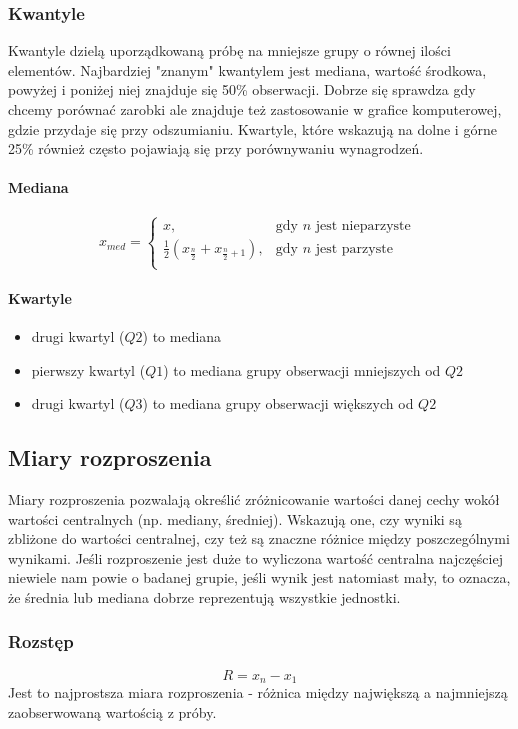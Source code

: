 \documentclass{article}
\theoremstyle{break}
\begin{document}
\subsubsection{Kwantyle}
Kwantyle dzielą uporządkowaną próbę na mniejsze grupy o równej ilości elementów. Najbardziej "znanym" kwantylem jest mediana, wartość środkowa, powyżej i poniżej niej znajduje się 50\% obserwacji. Dobrze się sprawdza gdy chcemy porównać zarobki ale znajduje też zastosowanie w grafice komputerowej, gdzie przydaje się przy odszumianiu. Kwartyle, które wskazują na dolne i górne 25\% również często pojawiają się przy porównywaniu wynagrodzeń.
\paragraph{Mediana}
$$x_{med}=
\begin{cases}
	x, &  \text{gdy $n$ jest nieparzyste }\\
	\frac{1}{2}(x_{\frac{n}{2}}+x_{\frac{n}{2}+1}), &  \text{gdy $n$ jest parzyste}\\
\end{cases}$$
\paragraph{Kwartyle}
\begin{itemize}
	\item drugi kwartyl ($Q2$) to mediana
	\item pierwszy kwartyl ($Q1$) to mediana grupy obserwacji mniejszych od $Q2$
	\item drugi kwartyl ($Q3$) to mediana grupy obserwacji większych od $Q2$
\end{itemize}

\subsection{Miary rozproszenia}

Miary rozproszenia pozwalają określić zróżnicowanie wartości danej cechy wokół wartości centralnych (np. mediany, średniej).  Wskazują one, czy wyniki są zbliżone do wartości centralnej, czy też są znaczne różnice między poszczególnymi wynikami. Jeśli rozproszenie jest duże to wyliczona wartość centralna najczęściej niewiele nam powie o badanej grupie, jeśli wynik jest natomiast mały, to oznacza, że średnia lub mediana dobrze reprezentują wszystkie jednostki.

\subsubsection{Rozstęp}
$$R=x_n-x_1$$
Jest to najprostsza miara rozproszenia - różnica między największą a najmniejszą zaobserwowaną wartością z próby. 
\end{document}
